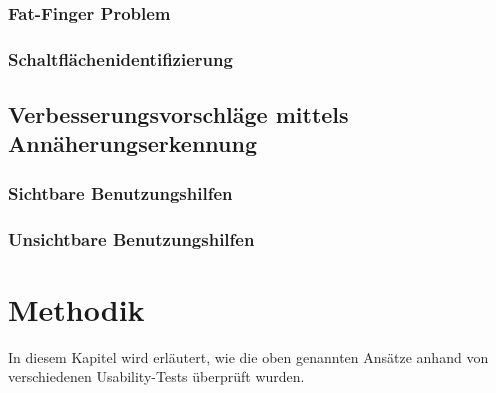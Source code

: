 \documentclass[a4paper,12pt,bibliography=totoc]{scrreprt}%
\begin{document}
\subsection{Fat-Finger Problem}
\subsection{Schaltflächenidentifizierung}
\section{Verbesserungsvorschläge mittels Annäherungserkennung}
\subsection{Sichtbare Benutzungshilfen}
\subsection{Unsichtbare Benutzungshilfen}

\chapter{Methodik}
In diesem Kapitel wird erläutert, wie die oben genannten Ansätze anhand von verschiedenen Usability-Tests überprüft wurden.
\end{document}
